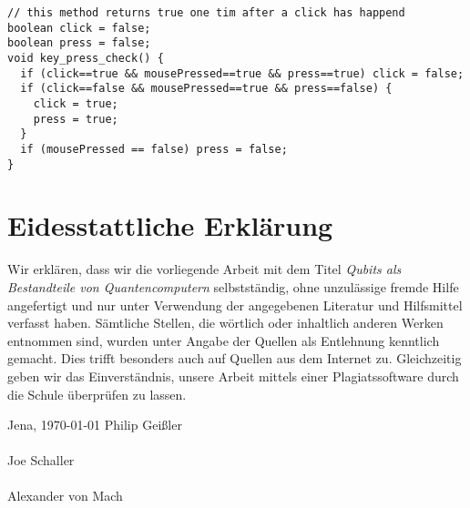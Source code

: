 \documentclass[12pt]{report}
\begin{document}
\begin{lstlisting}
// this method returns true one tim after a click has happend
boolean click = false;
boolean press = false;
void key_press_check() {
  if (click==true && mousePressed==true && press==true) click = false;
  if (click==false && mousePressed==true && press==false) { 
    click = true; 
    press = true;
  }
  if (mousePressed == false) press = false;
}
\end{lstlisting}


\chapter*{Eidesstattliche Erklärung}
Wir erklären, dass wir die vorliegende Arbeit mit dem Titel \emph{Qubits als Bestandteile von Quantencomputern} selbstständig, ohne unzulässige fremde Hilfe angefertigt und nur unter Verwendung der angegebenen Literatur und Hilfsmittel verfasst haben. Sämtliche Stellen, die wörtlich oder inhaltlich anderen Werken entnommen sind, wurden unter Angabe der Quellen als Entlehnung kenntlich gemacht. Dies trifft besonders auch auf Quellen aus dem Internet zu. Gleichzeitig geben wir das Einverständnis, unsere Arbeit mittels einer Plagiatssoftware durch die Schule überprüfen zu lassen.

\vskip 2cm

Jena, \today \newline \newline
Philip Gei\ss{}ler \hspace{1.5cm}\dotfill \\\\
Joe Schaller \hspace{1.5cm}\dotfill \\\\
Alexander von Mach \hspace{1.5cm}\dotfill
\end{document}
